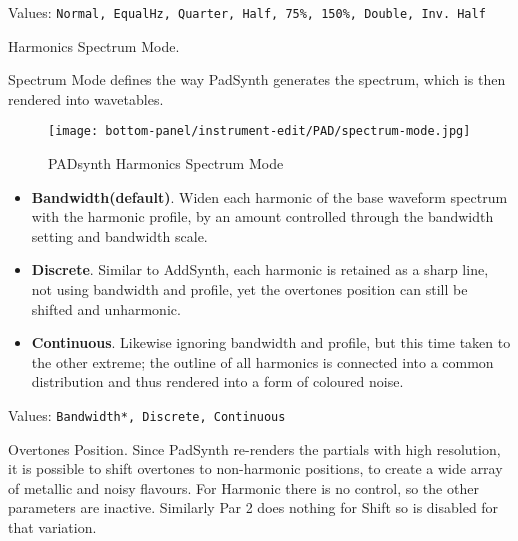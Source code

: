   Values: \texttt{Normal, EqualHz, Quarter, Half, 75\%, 150\%, Double, Inv.  Half}

   Harmonics Spectrum Mode.

   Spectrum Mode defines the way PadSynth generates the spectrum, which is then
   rendered into wavetables.
   
\begin{figure}[H]
   \centering
   \texttt{[image: bottom-panel/instrument-edit/PAD/spectrum-mode.jpg]}
   \caption{PADsynth Harmonics Spectrum Mode}
   \label{fig:padsynth_harmonics_spectrum mode}
\end{figure}

   \begin{itemize}
      \item \textbf{Bandwidth(default)}.
         Widen each harmonic of the base waveform spectrum with the harmonic
         profile, by an amount controlled through the bandwidth setting and
         bandwidth scale.
      \item \textbf{Discrete}.
         Similar to AddSynth, each harmonic is retained as a sharp line, not using
         bandwidth and profile, yet the overtones position can still be shifted
         and unharmonic.
      \item \textbf{Continuous}.
         Likewise ignoring bandwidth and profile, but this time taken to the other
         extreme; the outline of all harmonics is connected into a common
         distribution and thus rendered into a form of coloured noise.
   \end{itemize}

   Values: \texttt{Bandwidth*, Discrete, Continuous}

   Overtones Position.
   Since PadSynth re-renders the partials with high resolution, it is possible to
   shift overtones to non-harmonic positions, to create a wide array of metallic
   and noisy flavours. For Harmonic there is no control, so the other parameters
   are inactive. Similarly Par 2 does nothing for Shift so is disabled for that
   variation.

